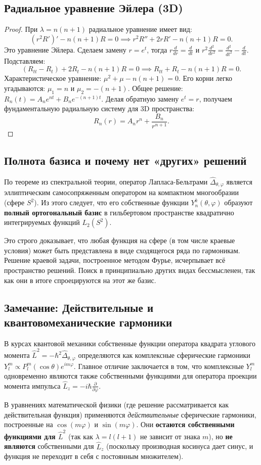 \documentclass[a4paper,10pt]{article}
\begin{document}
\subsection*{Радиальное уравнение Эйлера (3D)}
\begin{proof}
При $\lambda = n(n+1)$ радиальное уравнение имеет вид:
\[ (r^2 R')' - n(n+1)R = 0 \implies r^2 R'' + 2r R' - n(n+1)R = 0. \]
Это уравнение Эйлера. Сделаем замену $r = e^t$, тогда $r \frac{d}{dr} = \frac{d}{dt}$ и $r^2 \frac{d^2}{dr^2} = \frac{d^2}{dt^2} - \frac{d}{dt}$. Подставляем:
\[ (R_{tt} - R_t) + 2R_t - n(n+1)R = 0 \implies R_{tt} + R_t - n(n+1)R = 0. \]
Характеристическое уравнение: $\mu^2 + \mu - n(n+1) = 0$. 
Его корни легко угадываются: $\mu_1 = n$ и $\mu_2 = -(n+1)$. 
Общее решение: $R_n(t) = A_n e^{nt} + B_n e^{-(n+1)t}$.
Делая обратную замену $e^t = r$, получаем фундаментальную радиальную систему для 3D пространства:
\[ R_n(r) = A_n r^n + \frac{B_n}{r^{n+1}}. \]
\end{proof}

\subsection*{Полнота базиса и почему нет «других» решений}
По теореме из спектральной теории, оператор Лапласа-Бельтрами $\hat{\Delta}_{\theta,\varphi}$ является эллиптическим самосопряженным оператором на компактном многообразии (сфере $S^2$). Из этого следует, что его собственные функции $Y_n^k(\theta, \varphi)$ образуют \textbf{полный ортогональный базис} в гильбертовом пространстве квадратично интегрируемых функций $L_2(S^2)$. 

Это строго доказывает, что любая функция на сфере (в том числе краевые условия) может быть представлена в виде сходящегося ряда по гармоникам. Решение краевой задачи, построенное методом Фурье, исчерпывает всё пространство решений. Поиск в принципиально других видах бессмысленен, так как они в итоге спроецируются на этот же базис.

\subsection*{Замечание: Действительные и квантовомеханические гармоники}
В курсах квантовой механики собственные функции оператора квадрата углового момента $\hat{L}^2 = -\hbar^2 \hat{\Delta}_{\theta,\varphi}$ определяются как комплексные сферические гармоники $Y_l^m \propto P_l^m(\cos\theta) e^{im\varphi}$. 
Главное отличие заключается в том, что комплексные $Y_l^m$ одновременно являются также собственными функциями для оператора проекции момента импульса $\hat{L}_z = -i\hbar \frac{\partial}{\partial \varphi}$.

В уравнениях математической физики (где решение рассматривается как действительная функция) применяются \textit{действительные} сферические гармоники, построенные на $\cos(m\varphi)$ и $\sin(m\varphi)$. Они \textbf{остаются собственными функциями для $\hat{L}^2$} (так как $\lambda = l(l+1)$ не зависит от знака $m$), но \textbf{не являются} собственными для $\hat{L}_z$ (поскольку производная косинуса дает синус, и функция не переходит в себя с постоянным множителем).
\end{document}
